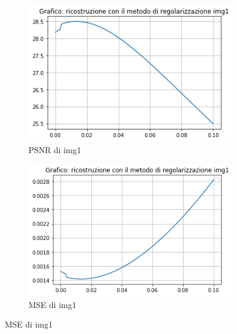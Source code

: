 \begin{figure}[H]
    \centering
    \begin{subfigure}{0.5\textwidth}
        \centering
        \includegraphics[width=\textwidth]{output/PSNR/outputPSNR-img1.png}
        \caption{PSNR di img1}
        \label{fig:img1PSNR}
    \end{subfigure}\hfill
    \begin{subfigure}{0.5\textwidth}
        \centering
        \includegraphics[width=\textwidth]{output/MSE/outputMSE-img1.png}
        \caption{MSE di img1}
        \label{fig:img1MSE}
    \end{subfigure}


\end{figure}
